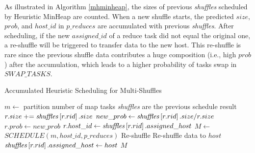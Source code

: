 As illustrated in Algorithm \ref{mhminheap}, the sizes of previous \emph{shuffles} scheduled by Heuristic MinHeap are counted. 
When a new shuffle starts, the predicted $size$, $prob$, and $host\_id$ in $p\_reduces$ are accumulated with previous \emph{shuffles}. 
After scheduling, if the new $assigned\_id$ of a reduce task did not equal the original one, a re-shuffle will be triggered to transfer data to the new host. 
This re-shuffle is rare since the previous shuffle data contributes a huge composition (i.e., high $prob$) after the accumulation, 
which leads to a higher probability of tasks swap in $SWAP\_TASKS$. 

\noindent
\begin{minipage}{0.95\columnwidth}
\begin{algorithm}[H]
\caption{Accumulated Heuristic Scheduling for Multi-Shuffles}
\label{mhminheap}
	\begin{algorithmic}[1]
	\small
		\State $m\gets$ partition number of map tasks
		\Comment \emph{shuffles} are the previous schedule result 
			\State $r.size \mathrel{+}= \text{\emph{shuffles}}\left[r.rid\right].size$
			\State $new\_prob\gets \text{\emph{shuffles}}\left[r.rid\right].size / r.size$
				\State $r.prob\gets new\_prob$
				\State $r.host\_id\gets \text{\emph{shuffles}}\left[r.rid\right].assigned\_host$
			\EndIf
		\EndFor
		\State $M\gets$ $SCHEDULE\left(m, host\_id, p\_reduces\right)$
			\Comment Re-shuffle
				\State Re-shuffle data to $host$
				\State $\text{\emph{shuffles}}\left[r.rid\right].assigned\_host\gets host$
				\EndIf
			\EndFor
		\EndFor
		\Return $M$
	\EndProcedure
	\end{algorithmic}
\end{algorithm}
\end{minipage}


